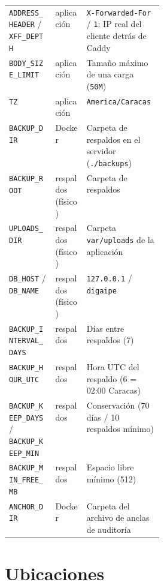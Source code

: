 \begin{xltabular}{\linewidth}{@{}>{\raggedright\arraybackslash}p{0.3\linewidth} l L@{}}
	\texttt{ADDRESS\_HEADER} / \texttt{XFF\_DEPTH} & aplicación & \texttt{X-Forwarded-For} /
	\texttt{1}: IP real del cliente detrás de Caddy \\
	\texttt{BODY\_SIZE\_LIMIT} & aplicación & Tamaño máximo de una carga (\texttt{50M}) \\
	\texttt{TZ} & aplicación & \texttt{America/Caracas} \\
	\texttt{BACKUP\_DIR} & Docker & Carpeta de respaldos en el servidor (\texttt{./backups}) \\
	\texttt{BACKUP\_ROOT} & respaldos (físico) & Carpeta de respaldos \\
	\texttt{UPLOADS\_DIR} & respaldos (físico) & Carpeta \texttt{var/uploads} de la aplicación \\
	\texttt{DB\_HOST} / \texttt{DB\_NAME} & respaldos (físico) & \texttt{127.0.0.1} /
	\texttt{digaipe} \\
	\texttt{BACKUP\_INTERVAL\_DAYS} & respaldos & Días entre respaldos (7) \\
	\texttt{BACKUP\_HOUR\_UTC} & respaldos & Hora UTC del respaldo (6 = 02:00 Caracas) \\
	\texttt{BACKUP\_KEEP\_DAYS} / \texttt{BACKUP\_KEEP\_MIN} & respaldos & Conservación (70 días /
	10 respaldos mínimo) \\
	\texttt{BACKUP\_MIN\_FREE\_MB} & respaldos & Espacio libre mínimo (512) \\
	\texttt{ANCHOR\_DIR} & Docker & Carpeta del archivo de anclas de auditoría \\
	\bottomrule
\end{xltabular}

\section{Ubicaciones}
\label{ap:ubicaciones}


